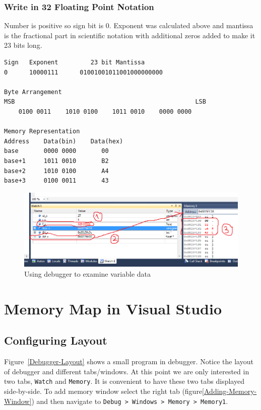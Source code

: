 \documentclass[12pt,a4paper]{article}
\begin{document}
\subsubsection{Write in 32 Floating Point Notation}
Number is positive so sign bit is 0. Exponent was calculated above and mantissa is the fractional part in scientific notation with additional zeros added to make it 23 bits long.
\begin{verbatim}
Sign   Exponent         23 bit Mantissa
0      10000111      01001001011001000000000

Byte Arrangement
MSB                                                  LSB
    0100 0011    1010 0100    1011 0010    0000 0000

Memory Representation
Address    Data(bin)    Data(hex)
base       0000 0000       00
base+1     1011 0010       B2
base+2     1010 0100       A4
base+3     0100 0011       43
\end{verbatim}
\begin{figure}[H]
\centering
\label{Floating-Point-Example}
\includegraphics[scale=0.65]{FloatingPointExample.png}
\caption{Using debugger to examine variable data}
\end{figure}

\section{Memory Map in Visual Studio}
\subsection{Configuring Layout}
Figure~\ref{Debugger-Layout} shows a small program in debugger. Notice the layout of debugger and different tabs/windows. At this point we are only interested in two tabs, \verb|Watch| and \verb|Memory|. It is convenient to have these two tabs displayed side-by-side. To add memory window select the right tab (figure\ref{Adding-Memory-Window}) and then navigate to \verb|Debug > Windows > Memory > Memory1|.
\end{document}

